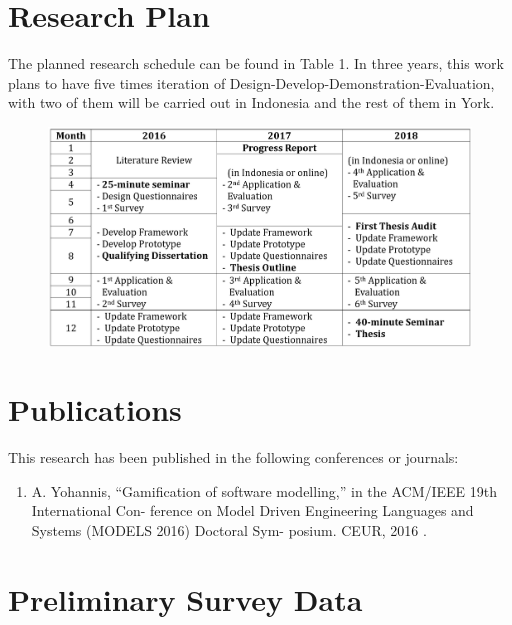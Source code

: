 \documentclass[12pt, a4paper]{report}
\begin{document}
\begin{appendices}

\chapter{Research Plan}
\label{Research Plan}
The planned research schedule can be found in Table 1. In three years, this work plans to have five times iteration of Design-Develop-Demonstration-Evaluation, with two of them will be carried out in Indonesia and the rest of them in York.

\begin {table}[ht]
\caption {Research Timetable} 
\end{table}
\begin{figure}[ht]
\centering
\includegraphics[width=\textwidth]{timetable}
\end{figure}

\chapter{Publications}
This research has been published in the following conferences or journals: 
\begin{enumerate}
 \item A. Yohannis, “Gamiﬁcation of software modelling,” in the ACM/IEEE 19th International Con-
ference on Model Driven Engineering Languages and Systems (MODELS 2016) Doctoral Sym-
posium. CEUR, 2016 \cite{Yohannis2016}.
\end{enumerate}

\chapter{Preliminary Survey Data}
\label{chap:Preliminary Survey Data}


\end{appendices}
\end{document}
